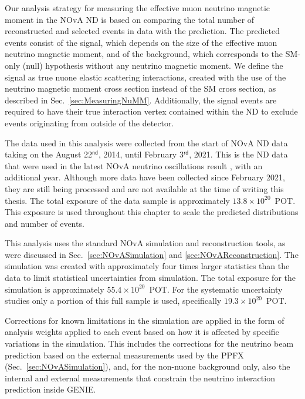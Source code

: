 Our analysis strategy for measuring the effective muon neutrino magnetic moment in the \gls{NOvA} \gls{ND} is based on comparing the total number of reconstructed and selected events in data with the prediction. The predicted events consist of the signal, which depends on the size of the effective muon neutrino magnetic moment, and of the background, which corresponds to the \gls{SM}-only (null) hypothesis without any neutrino magnetic moment. We define the signal as true \gls{nuone} elastic scattering interactions, created with the use of the neutrino magnetic moment cross section instead of the \gls{SM} cross section, as described in Sec.~\ref{sec:MeasuringNuMM}. Additionally, the signal events are required to have their true interaction vertex contained within the \gls{ND} to exclude events originating from outside of the detector.

The data used in this analysis were collected from the start of \gls{NOvA} \gls{ND} data taking on the August 22$^{\textsf{nd}}$, 2014, until February 3$^{\textsf{rd}}$, 2021. This is the \gls{ND} data that were used in the latest \gls{NOvA} neutrino oscillations result \cite{NOvAResults2021.pdf}, with an additional year. Although more data have been collected since February 2021, they are still being processed and are not available at the time of writing this thesis. The total exposure of the data sample is approximately $13.8\times10^{20}$~\gls{POT}. This exposure is used throughout this chapter to scale the predicted distributions and number of events.

This analysis uses the standard \gls{NOvA} simulation and reconstruction tools, as were discussed in Sec.~\ref{sec:NOvASimulation} and \ref{sec:NOvAReconstruction}. The simulation was created with approximately four times larger statistics than the data to limit statistical uncertainties from simulation. The total exposure for the simulation is approximately $55.4\times10^{20}$~\gls{POT}. For the systematic uncertainty studies only a portion of this full sample is used, specifically $19.3\times10^{20}$~\gls{POT}.

Corrections for known limitations in the simulation are applied in the form of analysis weights applied to each event based on how it is affected by specific variations in the simulation. This includes the corrections for the neutrino beam prediction based on the external measurements used by the \gls{PPFX} (Sec.~\ref{sec:NOvASimulation}), and, for the non-\gls{nuone} background only, also the internal and external measurements that constrain the neutrino interaction prediction inside GENIE.

